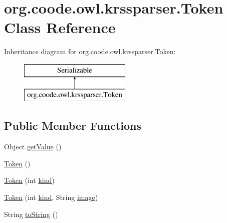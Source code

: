 \hypertarget{classorg_1_1coode_1_1owl_1_1krssparser_1_1_token}{\section{org.\-coode.\-owl.\-krssparser.\-Token Class Reference}
\label{classorg_1_1coode_1_1owl_1_1krssparser_1_1_token}
}
Inheritance diagram for org.\-coode.\-owl.\-krssparser.\-Token\-:\begin{figure}[H]
\begin{center}
\leavevmode
\includegraphics[height=2.000000cm]{classorg_1_1coode_1_1owl_1_1krssparser_1_1_token}
\end{center}
\end{figure}
\subsection*{Public Member Functions}
\begin{DoxyCompactItemize}
\item 
Object \hyperlink{classorg_1_1coode_1_1owl_1_1krssparser_1_1_token_ada5996248d2b6a1d3dbf9e288df5f50f}{get\-Value} ()
\item 
\hyperlink{classorg_1_1coode_1_1owl_1_1krssparser_1_1_token_a9dd33e63b9fa8b1c76057ff070bd19b6}{Token} ()
\item 
\hyperlink{classorg_1_1coode_1_1owl_1_1krssparser_1_1_token_ab4d3d076a62edd51fa375018ce8f78ee}{Token} (int \hyperlink{classorg_1_1coode_1_1owl_1_1krssparser_1_1_token_a750503fccc1713c1af8c817d02b55231}{kind})
\item 
\hyperlink{classorg_1_1coode_1_1owl_1_1krssparser_1_1_token_aaa097f01957e78b872b5cddc1cbb720d}{Token} (int \hyperlink{classorg_1_1coode_1_1owl_1_1krssparser_1_1_token_a750503fccc1713c1af8c817d02b55231}{kind}, String \hyperlink{classorg_1_1coode_1_1owl_1_1krssparser_1_1_token_aa8322c67e1704d675afc0c1aef9ad3eb}{image})
\item 
String \hyperlink{classorg_1_1coode_1_1owl_1_1krssparser_1_1_token_ac362db0ed5103c395d52e7f29b820a93}{to\-String} ()
\end{DoxyCompactItemize}

